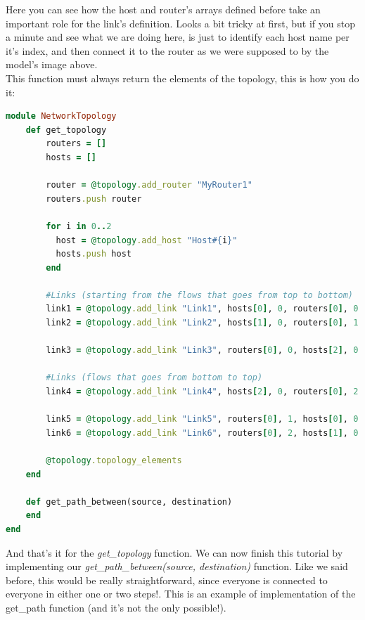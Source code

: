Here you can see how the host and router's arrays defined before take an important role for the link's definition. Looks a bit tricky at first, but if you stop a minute and see what we are doing here, is just to identify each host name per it's index, and then connect it to the router as we were supposed to by the model's image above. \\
This function must always return the elements of the topology, this is how you do it:

\begin{lstlisting}[language=Ruby,breaklines=true]
module NetworkTopology
	def get_topology
		routers = []
        hosts = []

        router = @topology.add_router "MyRouter1"
        routers.push router

        for i in 0..2  
          host = @topology.add_host "Host#{i}"
          hosts.push host     
        end
        
        #Links (starting from the flows that goes from top to bottom)    
        link1 = @topology.add_link "Link1", hosts[0], 0, routers[0], 0
        link2 = @topology.add_link "Link2", hosts[1], 0, routers[0], 1

        link3 = @topology.add_link "Link3", routers[0], 0, hosts[2], 0

        #Links (flows that goes from bottom to top)    
        link4 = @topology.add_link "Link4", hosts[2], 0, routers[0], 2

        link5 = @topology.add_link "Link5", routers[0], 1, hosts[0], 0
        link6 = @topology.add_link "Link6", routers[0], 2, hosts[1], 0
        
        @topology.topology_elements
	end
    
    def get_path_between(source, destination)
    end
end
\end{lstlisting}

And that's it for the \textit{get\_topology} function. We can now finish this tutorial by implementing our \textit{get\_path\_between(source, destination)} function. Like we said before, this would be really straightforward, since everyone is connected to everyone in either one or two steps!. This is an example of implementation of the get\_path function (and it's not the only possible!).

